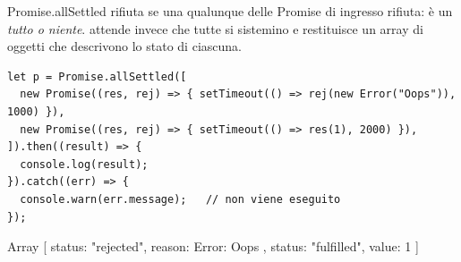 \begin{esempio}{Promise.allSettled}
 rifiuta se una qualunque delle Promise di ingresso rifiuta:
è un \textit{tutto o niente}.  attende invece che tutte
si sistemino e restituisce un array di oggetti che descrivono lo stato di
ciascuna.

\begin{affianco}[0.62][c]
\codicepiccolo
\begin{lstlisting}[style=js, name=promise-allsettled.js]
let p = Promise.allSettled([
  new Promise((res, rej) => { setTimeout(() => rej(new Error("Oops")), 1000) }),
  new Promise((res, rej) => { setTimeout(() => res(1), 2000) }),
]).then((result) => {
  console.log(result);
}).catch((err) => {
  console.warn(err.message);   // non viene eseguito
});
\end{lstlisting}
\risultato
\begin{console}
Array [
  { status: "rejected",
    reason: Error: Oops },
  { status: "fulfilled",
    value: 1 }
]
\end{console}
\end{affianco}
\end{esempio}

